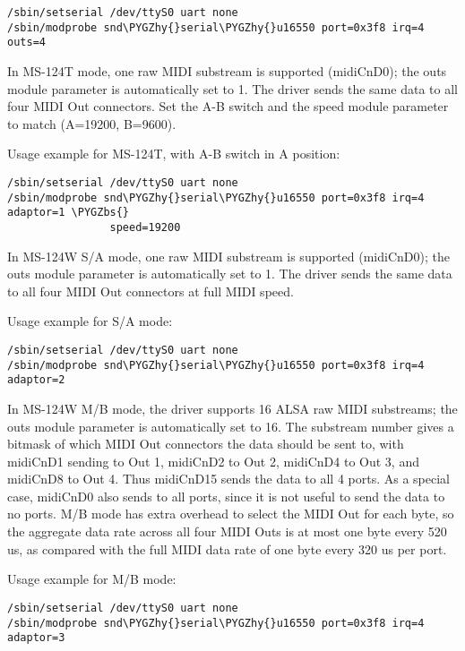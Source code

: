 \documentclass[a4paper,8pt,english]{sphinxmanual}
\def\PYGZbs{\char`\\}
\def\PYGZhy{\char`\-}
\begin{document}
\begin{Verbatim}[commandchars=\\\{\}]
/sbin/setserial /dev/ttyS0 uart none
/sbin/modprobe snd\PYGZhy{}serial\PYGZhy{}u16550 port=0x3f8 irq=4 outs=4
\end{Verbatim}

In MS-124T mode, one raw MIDI substream is supported (midiCnD0); the outs
module parameter is automatically set to 1. The driver sends the same data to
all four MIDI Out connectors.  Set the A-B switch and the speed module
parameter to match (A=19200, B=9600).

Usage example for MS-124T, with A-B switch in A position:

\begin{Verbatim}[commandchars=\\\{\}]
/sbin/setserial /dev/ttyS0 uart none
/sbin/modprobe snd\PYGZhy{}serial\PYGZhy{}u16550 port=0x3f8 irq=4 adaptor=1 \PYGZbs{}
                speed=19200
\end{Verbatim}

In MS-124W S/A mode, one raw MIDI substream is supported (midiCnD0);
the outs module parameter is automatically set to 1. The driver sends
the same data to all four MIDI Out connectors at full MIDI speed.

Usage example for S/A mode:

\begin{Verbatim}[commandchars=\\\{\}]
/sbin/setserial /dev/ttyS0 uart none
/sbin/modprobe snd\PYGZhy{}serial\PYGZhy{}u16550 port=0x3f8 irq=4 adaptor=2
\end{Verbatim}

In MS-124W M/B mode, the driver supports 16 ALSA raw MIDI substreams;
the outs module parameter is automatically set to 16.  The substream
number gives a bitmask of which MIDI Out connectors the data should be
sent to, with midiCnD1 sending to Out 1, midiCnD2 to Out 2, midiCnD4 to
Out 3, and midiCnD8 to Out 4.  Thus midiCnD15 sends the data to all 4 ports.
As a special case, midiCnD0 also sends to all ports, since it is not useful
to send the data to no ports.  M/B mode has extra overhead to select the MIDI
Out for each byte, so the aggregate data rate across all four MIDI Outs is
at most one byte every 520 us, as compared with the full MIDI data rate of
one byte every 320 us per port.

Usage example for M/B mode:

\begin{Verbatim}[commandchars=\\\{\}]
/sbin/setserial /dev/ttyS0 uart none
/sbin/modprobe snd\PYGZhy{}serial\PYGZhy{}u16550 port=0x3f8 irq=4 adaptor=3
\end{Verbatim}
\end{document}

